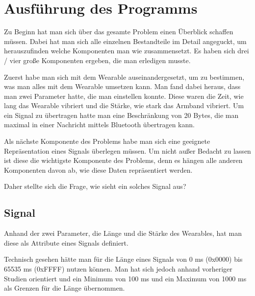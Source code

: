 
\section{Ausf{\"u}hrung des Programms}
\label{ch:Entwurf:sec:Ausf{\"u}hrung des Programms}

Zu Beginn hat man sich {\"u}ber das gesamte Problem einen {\"U}berblick schaffen m{\"u}ssen.
Dabei hat man sich alle einzelnen Bestandteile im Detail angeguckt, um herauszufinden welche Komponenten man wie zusammensetzt. 
Es haben sich drei / vier gro{\ss}e Komponenten ergeben, die man erledigen musste. 

Zuerst habe man sich mit dem Wearable auseinandergesetzt, um zu bestimmen, was man alles mit dem Wearable umsetzen kann.
Man fand dabei heraus, dass man zwei Parameter hatte, die man einstellen konnte. Diese waren die Zeit, wie lang das Wearable vibriert und die St{\"a}rke, wie stark das Armband vibriert.
Um ein Signal zu {\"u}bertragen hatte man eine Beschr{\"a}nkung von 20 Bytes, die man maximal in einer Nachricht mittels Bluetooth {\"u}bertragen kann.

Als n{\"a}chste Komponente des Problems habe man sich eine geeignete Repr{\"a}sentation eines Signals {\"u}berlegen m{\"u}ssen. Um nicht au{\ss}er Bedacht zu lassen ist diese die wichtigste Komponente des Problems, denn es h{\"a}ngen alle anderen Komponenten davon ab, wie diese Daten repr{\"a}sentiert werden. 

Daher stellte sich die Frage, wie sieht ein solches Signal aus?

\subsection{Signal}

Anhand der zwei Parameter, die L{\"a}nge und die St{\"a}rke des Wearables, hat man diese als Attribute eines Signals definiert.  

Technisch gesehen h{\"a}tte man f{\"u}r die L{\"a}nge eines Signals von 0 ms (0x0000) bis 65535 ms (0xFFFF) nutzen k{\"o}nnen. 
Man hat sich jedoch anhand vorheriger Studien \cite{pescara2016ruttelflug} orientiert und ein Minimum von 100 ms und ein Maximum von 1000 ms als Grenzen f{\"u}r die L{\"a}nge {\"u}bernommen.

